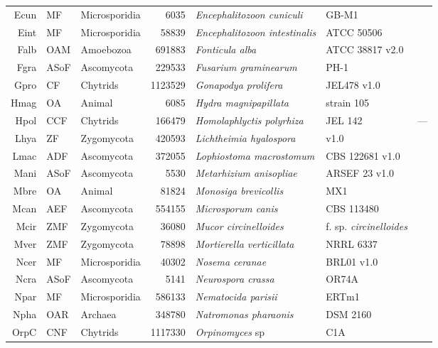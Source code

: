 {{{\begin{longtable}{rllrlll}
  Ecun & MF & Microsporidia & 6035 & \emph{Encephalitozoon cuniculi} & GB-M1 & \cite{Micro} \\ 
  Eint & MF & Microsporidia & 58839 & \emph{Encephalitozoon intestinalis} & ATCC 50506 & \cite{Micro} \\ 
  Falb & OAM & Amoebozoa & 691883 & \emph{Fonticula alba} & ATCC 38817 v2.0 & \cite{RuizTrillo2007} \\ 
  Fgra & ASoF & Ascomycota & 229533 & \emph{Fusarium graminearum } & PH-1 & \cite{Fgra} \\ 
  Gpro & CF & Chytrids & 1123529 & \emph{Gonapodya prolifera} & JEL478 v1.0 & \cite{Chang2015} \\ 
  Hmag & OA & Animal & 6085 & \emph{Hydra magnipapillata} & strain 105 & \cite{Chapman2010} \\ 
  Hpol & CCF & Chytrids & 166479 & \emph{Homolaphlyctis polyrhiza} & JEL 142 & --- \\ 
  Lhya & ZF & Zygomycota & 420593 & \emph{Lichtheimia hyalospora} & v1.0 & \cite{Lhya} \\ 
  Lmac & ADF & Ascomycota & 372055 & \emph{Lophiostoma macrostomum} & CBS 122681 v1.0 & \cite{Lmac} \\ 
  Mani & ASoF & Ascomycota & 5530 & \emph{Metarhizium anisopliae} & ARSEF 23 v1.0 & \cite{Gao2011} \\ 
  Mbre & OA & Animal & 81824 & \emph{Monosiga brevicollis} & MX1 & \cite{RuizTrillo2007} \\ 
  Mcan & AEF & Ascomycota & 554155 & \emph{Microsporum canis} & CBS 113480 & \cite{Dermato} \\ 
  Mcir & ZMF & Zygomycota & 36080 & \emph{Mucor circinelloides} & f. sp. \emph{circinelloides} & \cite{Lee2014} \\ 
  Mver & ZMF & Zygomycota & 78898 & \emph{Mortierella verticillata} & NRRL 6337 & \cite{RuizTrillo2007} \\ 
  Ncer & MF & Microsporidia & 40302 & \emph{Nosema ceranae} & BRL01 v1.0 & \cite{Cornman2009} \\ 
  Ncra & ASoF & Ascomycota & 5141 & \emph{Neurospora crassa} & OR74A & \cite{Ncra} \\ 
  Npar & MF & Microsporidia & 586133 & \emph{Nematocida parisii} & ERTm1 & \cite{Cuomo2012} \\ 
  Npha & OAR & Archaea & 348780 & \emph{Natromonas pharaonis} & DSM 2160 & \cite{Falb2005} \\ 
  OrpC & CNF & Chytrids & 1117330 & \emph{Orpinomyces} sp & C1A & \cite{Youssef2013} \\ 

\end{longtable}}}}

